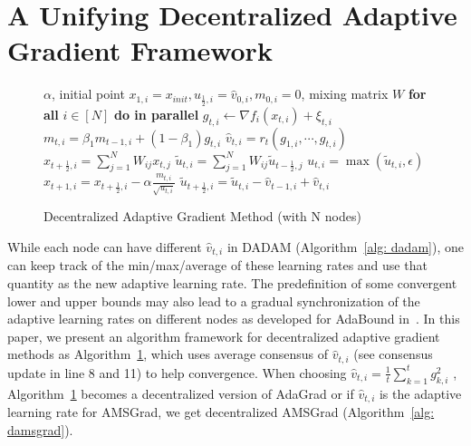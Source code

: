 \documentclass[anon,12pt]{colt2021} %
\begin{document}
\vspace{-0.05in}
\section{A Unifying Decentralized Adaptive Gradient Framework}\label{sec:main}
\vspace{-0.05in}

\begin{figure}\vspace{-0.8cm}
\begin{minipage}{\linewidth}
\begin{algorithm}[H]
	\caption{Decentralized Adaptive Gradient Method (with N nodes)}
	\label{alg: dadaptive}
	\begin{algorithmic}[1]
		  $\alpha$, initial point $x_{1,i} = x_{init}, u_{\frac{1}{2},i} = \hat v_{0,i}, m_{0,i}=0$, mixing matrix $W$
		\STATE \textbf{for all }$i \in [N]$ \textbf{do in parallel}
		\STATE \quad $g_{t,i}  \leftarrow \nabla f_i(x_{t,i}) + \xi_{t,i}$
		\STATE \quad $m_{t,i} = \beta_1 m_{t-1,i} + (1-\beta_1) g_{t,i}$ 
		\STATE  \quad $\hat v_{t,i} = r_t(g_{1,i},\cdots,g_{t,i})$
		\STATE \quad $x_{t+\frac{1}{2},i} = \sum_{j=1}^N W_{ij}x_{t,j}$
	    \STATE \quad $\tilde u_{t,i} = \sum_{j=1}^N W_{ij} \tilde u_{t-\frac{1}{2},j}$
	    \STATE  \quad $u_{t,i} = \max(\tilde u_{t,i}, \epsilon)$
		\STATE \quad $x_{t+1,i} = x_{t+\frac{1}{2},i} - \alpha \frac{m_{t,i}}{\sqrt{u_{t,i}}}$
		\STATE \quad $\tilde u_{t+\frac{1}{2},i} = \tilde u_{t,i} - \hat v_{t-1,i} + \hat v_{t,i}$
		\ENDFOR
	\end{algorithmic}
\end{algorithm}
\end{minipage}
\end{figure}
While each node can have different $\hat v_{t,i}$ in DADAM (Algorithm~\ref{alg: dadam}), one can keep track of the min/max/average of these learning rates and use that quantity as the new adaptive learning rate. 
The predefinition of some convergent lower and upper bounds may also lead to a gradual synchronization of the adaptive learning rates on different nodes as developed for AdaBound in~\cite{luo2019adaptive}.
In this paper, we present an algorithm framework for decentralized adaptive gradient methods as Algorithm~\ref{alg: dadaptive}, which uses average consensus of $\hat v_{t,i}$ (see consensus update in line 8 and 11) to help convergence.  
When choosing $\hat v_{t,i} = {\frac{1}{t}\sum_{k=1}^t g_{k,i}^2}$ , Algorithm~\ref{alg: dadaptive} becomes a decentralized version of AdaGrad or if $\hat v_{t,i}$ is the adaptive learning rate for AMSGrad, we get decentralized AMSGrad (Algorithm~\ref{alg: damsgrad}).
\end{document}
